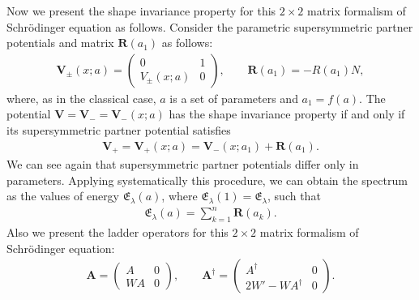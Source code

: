 \documentclass[10pt,a4paper]{amsart}
\numberwithin{equation}{section}
\begin{document}
Now we present the shape invariance property for this $2\times 2$ matrix formalism of Schr\"odinger equation as follows. Consider the parametric supersymmetric partner potentials and matrix $\mathbf{R}(a_1)$ as follows:
\begin{gather*}
\mathbf{V}_\pm(x;a)=\begin{pmatrix}0&1\\V_{\pm}(x;a)&0\end{pmatrix}\!,\qquad
\mathbf{R}(a_1)=-R(a_1)N,
\end{gather*}where, as in the classical case, $a$ is a set of parameters and $a_1=f(a)$. The potential $\mathbf{V}=\mathbf{V}_-=\mathbf{V}_-(x;a)$ has the shape invariance property if and only if its supersymmetric partner potential satisfies
\begin{gather*}
\mathbf{V}_+=\mathbf{V}_+(x;a)=\mathbf{V}_-(x;a_1)+\mathbf{R}(a_1).
\end{gather*}
We can see again that supersymmetric partner potentials differ only in parameters. Applying systematically this procedure, we can obtain the spectrum as the values of energy $\mathfrak E_\lambda (a)$, where $ \mathfrak E_\lambda (1) = \mathfrak E_\lambda $, such that
\begin{gather*}
\mathfrak E_\lambda (a)=\sum_{k=1}^n \mathbf{R}(a_k).
\end{gather*}
Also we present the ladder operators for this $2\times 2$ matrix formalism of Schr\"odinger equation:
\begin{gather*}
\mathbf{A}=\begin{pmatrix}A&0\\WA&0\end{pmatrix}\!,\qquad
\mathbf{A}^\dag=\begin{pmatrix} A^\dag &0\\2W'-WA^\dag &0 \end{pmatrix}\!.
\end{gather*}
\end{document}
